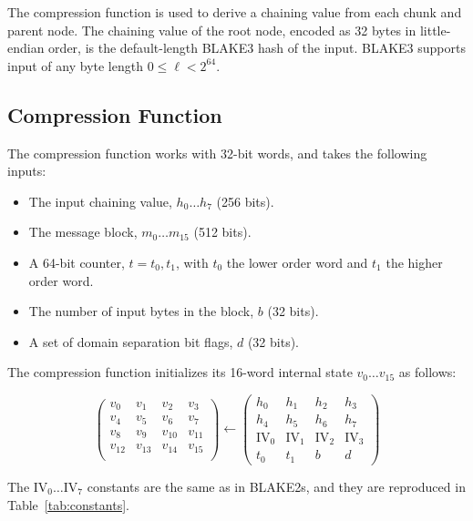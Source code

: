 \documentclass[11pt,notitlepage,a4paper]{article}
\newcommand{\IV}{\text{IV}}
\begin{document}
The compression function is used to derive a chaining value from each chunk and
parent node. The chaining value of the root node, encoded as 32 bytes in
little-endian order, is the default-length BLAKE3 hash of the input. BLAKE3
supports input of any byte length $0 \leq \ell < 2^{64}$.

\subsection{Compression Function}\label{sec:compression}

The compression function works with 32-bit words, and takes the
following inputs:

\begin{itemize}
    \item The input chaining value, $h_{0} \ldots h_{7}$ (256 bits).
    \item The message block, $m_{0} \ldots m_{15}$  (512 bits).
    \item A 64-bit counter, $t=t_{0},t_{1}$, with $t_{0}$ the lower order word
        and $t_{1}$ the higher order word.
    \item The number of input bytes in the block, $b$ (32 bits).
    \item A set of domain separation bit flags, $d$ (32 bits).
\end{itemize}

The compression function initializes its 16-word internal state $v_{0} \ldots
v_{15}$ as follows: 

\begin{equation*}
\begin{pmatrix}
v_{0} & v_{1} & v_{2} & v_{3} \\
v_{4} & v_{5} & v_{6} & v_{7} \\
v_{8} & v_{9} & v_{10} & v_{11} \\
v_{12} & v_{13} & v_{14} & v_{15} \\
\end{pmatrix}
\leftarrow
\begin{pmatrix}
h_{0} & h_{1} & h_{2} & h_{3} \\
h_{4} & h_{5} & h_{6} & h_{7} \\
\IV_{0} & \IV_{1} & \IV_{2} & \IV_{3} \\
t_{0} & t_{1} & b & d 
\end{pmatrix}
\end{equation*}

The $\IV_{0} \ldots \IV_{7}$ constants are the same as in
BLAKE2s, and they are reproduced in Table~\ref{tab:constants}.
\end{document}
